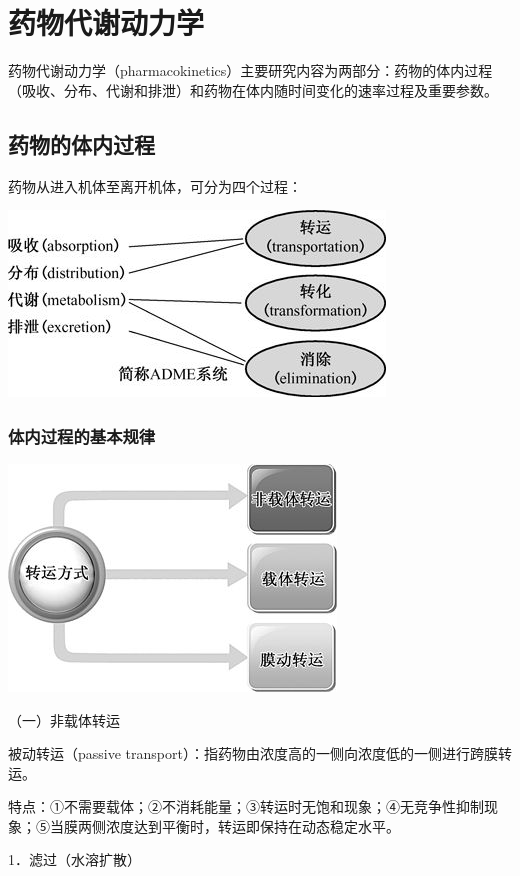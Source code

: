 \chapter{药物代谢动力学}
药物代谢动力学（pharmacokinetics）主要研究内容为两部分：药物的体内过程（吸收、分布、代谢和排泄）和药物在体内随时间变化的速率过程及重要参数。

\section{药物的体内过程}

药物从进入机体至离开机体，可分为四个过程：
\begin{center}
\includegraphics{./images/Image00023.jpg}
\end{center}
\subsection{体内过程的基本规律}
\begin{center}
\includegraphics{./images/Image00024.jpg}
\end{center}
（一）非载体转运

被动转运（passive
transport）：指药物由浓度高的一侧向浓度低的一侧进行跨膜转运。

特点：①不需要载体；②不消耗能量；③转运时无饱和现象；④无竞争性抑制现象；⑤当膜两侧浓度达到平衡时，转运即保持在动态稳定水平。

1．滤过（水溶扩散）

